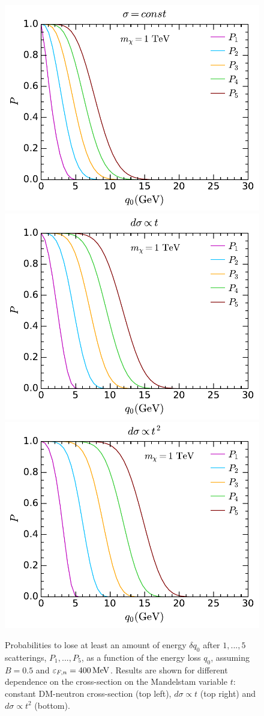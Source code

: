 \begin{figure}[t]
    \centering
    \includegraphics[width=.48\textwidth]{capture_1/probs_n0.pdf}
    \includegraphics[width=.48\textwidth]{capture_1/probs_n1.pdf}\\
    \includegraphics[width=.48\textwidth]{capture_1/probs_n2.pdf}
    \caption{Probabilities to lose at least an amount of energy $\delta q_0$  after $1,...,5$ scatterings,  $P_1,...,P_5$, as a function of the energy loss $q_0$,  assuming $B=0.5$ and $\varepsilon_{F,n}=400{\rm \,MeV}$. Results are shown for different dependence on the cross-section on the Mandelstam variable $t$: constant DM-neutron cross-section (top left), $d\sigma\propto t$ (top right) and $d\sigma\propto t^2$ (bottom). }
    \label{ch3:fig:pn}
\end{figure}


